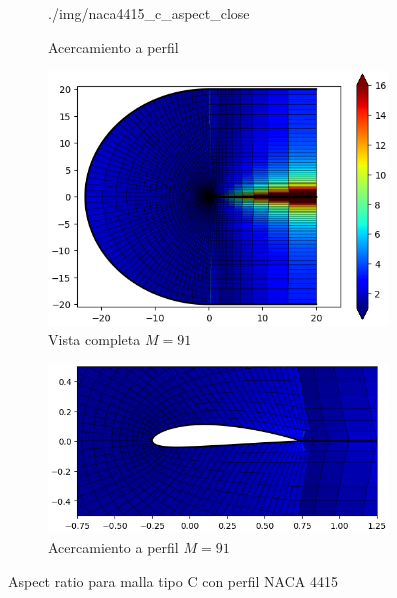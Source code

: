 \documentclass[letterpaper, openright, 12pt]{book}
\begin{document}
\begin{figure}[htbp!]
\begin{subfigure}[c]{0.48\textwidth}
                {./img/naca4415_c_aspect_close}
            \caption{Acercamiento a perfil}
            \label{fig:naca4415_c_aspect_close}
        \end{subfigure}
        \begin{subfigure}[c]{0.48\textwidth}
            \includegraphics[keepaspectratio, width=0.99\textwidth]
                {./img/naca4415_c_m_91_aspect_far}
            \caption{Vista completa $M=91$}
            \label{fig:naca4415_c_m_91_aspect_far}
        \end{subfigure}
        \hfill
        \begin{subfigure}[c]{0.48\textwidth}
            \includegraphics[keepaspectratio, width=0.99\textwidth]
                {./img/naca4415_c_m_91_aspect_close}
            \caption{Acercamiento a perfil $M=91$}
            \label{fig:naca4415_c_m_91_aspect_close}
        \end{subfigure}
        \caption{Aspect ratio para malla tipo C con perfil NACA 4415}
        \label{fig:naca4415_c_aspect_0}
    \end{figure}
\end{document}
